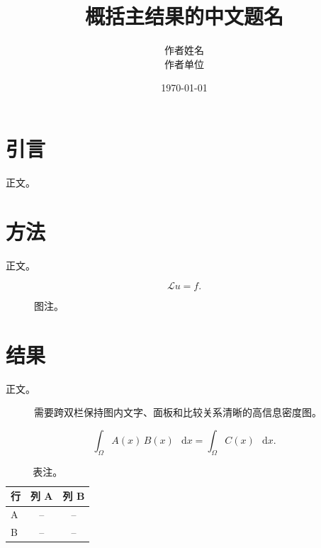 \documentclass[UTF8,a4paper,10pt,twocolumn,fontset=fandol]{ctexart}
\title{概括主结果的中文题名}
\author{作者姓名\\\small 作者单位}
\date{\today}
\providecommand{\dd}{\mathop{}\!\mathrm{d}}
\theoremstyle{definition}
\theoremstyle{remark}
\begin{document}

\section{引言}

正文。

\section{方法}

正文。

\begin{equation}
  \mathcal{L}u = f .
  \label{eq:example-zh}
\end{equation}

\begin{figure}[t]
  \centering
  \fbox{\rule{0pt}{1.35in}\rule{0.90\columnwidth}{0pt}}
  \caption{图注。\label{fig:example-zh}}
\end{figure}

\section{结果}

正文。

\begin{figure}[t]
  \centering
  \fbox{\rule{0pt}{1.55in}\rule{0.96\textwidth}{0pt}}
  \caption{需要跨双栏保持图内文字、面板和比较关系清晰的高信息密度图。\label{fig:two-column-zh}}
\end{figure}

\begin{equation}
  \int_{\Omega} A(x)\,B(x)\,\dd x
  =
  \int_{\Omega} C(x)\,\dd x .
  \label{eq:wide-example-zh}
\end{equation}

\begin{table}[b]
  \caption{表注。\label{tab:example-zh}}
  \begin{tabular}{lcc}
  \toprule
  行 & 列 A & 列 B \\
  \midrule
  A & -- & -- \\
  B & -- & -- \\
  \bottomrule
  \end{tabular}
\end{table}
\end{document}
